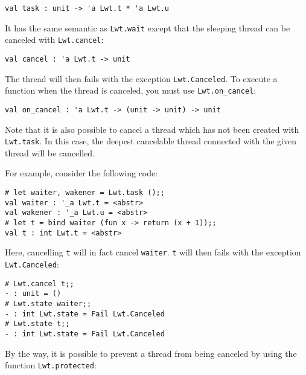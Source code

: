 \lstset{language=[Objective]Caml}\begin{lstlisting}
val task : unit -> 'a Lwt.t * 'a Lwt.u

\end{lstlisting}
It has the same semantic as {\tt Lwt.wait} except that the
sleeping thread can be canceled with {\tt Lwt.cancel}:



\lstset{language=[Objective]Caml}\begin{lstlisting}
val cancel : 'a Lwt.t -> unit

\end{lstlisting}
The thread will then fails with the exception
{\tt Lwt.Canceled}. To execute a function when the thread is
canceled, you must use {\tt Lwt.on\_cancel}:



\lstset{language=[Objective]Caml}\begin{lstlisting}
val on_cancel : 'a Lwt.t -> (unit -> unit) -> unit

\end{lstlisting}
Note that it is also possible to cancel a thread which has not been
created with {\tt Lwt.task}. In this case, the deepest cancelable
thread connected with the given thread will be cancelled.



For example, consider the following code:



\lstset{language=[Objective]Caml}\begin{lstlisting}
# let waiter, wakener = Lwt.task ();;
val waiter : '_a Lwt.t = <abstr>
val wakener : '_a Lwt.u = <abstr>
# let t = bind waiter (fun x -> return (x + 1));;
val t : int Lwt.t = <abstr>

\end{lstlisting}
Here, cancelling {\tt t} will in fact cancel {\tt waiter}.
{\tt t} will then fails with the exception {\tt Lwt.Canceled}:



\lstset{language=[Objective]Caml}\begin{lstlisting}
# Lwt.cancel t;;
- : unit = ()
# Lwt.state waiter;;
- : int Lwt.state = Fail Lwt.Canceled
# Lwt.state t;;
- : int Lwt.state = Fail Lwt.Canceled

\end{lstlisting}
By the way, it is possible to prevent a thread from being canceled
by using the function {\tt Lwt.protected}:



